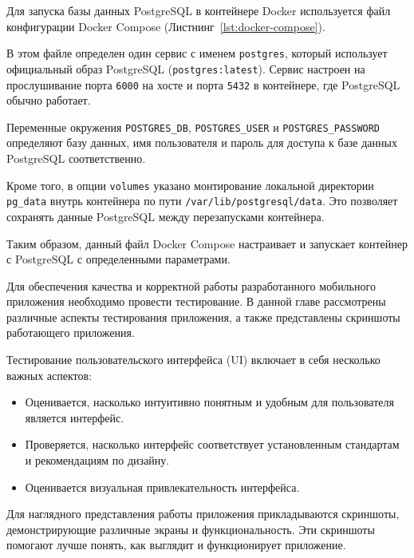 
Для запуска базы данных PostgreSQL в контейнере Docker используется файл
конфигурации Docker Compose (Листнинг~\ref{lst:docker-compose}).\par
В этом файле определен один сервис с именем \texttt{postgres},
который использует официальный образ PostgreSQL (\texttt{postgres:latest}).
Сервис настроен на прослушивание порта \texttt{6000} на хосте
и порта \texttt{5432} в контейнере, где PostgreSQL обычно работает.\par
Переменные окружения \texttt{POSTGRES\_DB}, \texttt{POSTGRES\_USER}
и \texttt{POSTGRES\_PASSWORD} определяют базу данных, имя пользователя
и пароль для доступа к базе данных PostgreSQL соответственно.\par
Кроме того, в опции \texttt{volumes} указано монтирование локальной директории 
\texttt{pg\_data} внутрь контейнера по пути \texttt{/var/lib/postgresql/data}. 
Это позволяет сохранять данные PostgreSQL между перезапусками контейнера.\par
Таким образом, данный файл Docker Compose настраивает и запускает контейнер
с PostgreSQL с определенными параметрами.


Для обеспечения качества и корректной работы разработанного мобильного
приложения необходимо провести тестирование.
В данной главе рассмотрены различные аспекты тестирования приложения,
а также представлены скриншоты работающего приложения.


Тестирование пользовательского интерфейса (UI) включает
в себя несколько важных аспектов:

\begin{itemize}
	\item Оценивается, насколько интуитивно понятным
		и удобным для пользователя является интерфейс.
	\item Проверяется, насколько интерфейс соответствует установленным
		стандартам и рекомендациям по дизайну.
	\item Оценивается визуальная привлекательность интерфейса.
\end{itemize}

Для наглядного представления работы приложения прикладываются
скриншоты, демонстрирующие различные экраны и функциональность.
Эти скриншоты помогают лучше понять, как выглядит и функционирует приложение.

